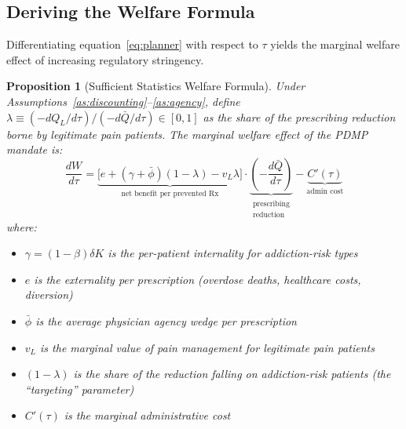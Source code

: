 \documentclass[12pt]{article}
\newtheorem{proposition}{Proposition}
\begin{document}
\subsection{Deriving the Welfare Formula}\label{sec:framework_derivation}

Differentiating equation~\eqref{eq:planner} with respect to $\tau$ yields the marginal welfare effect of increasing regulatory stringency.

\begin{proposition}[Sufficient Statistics Welfare Formula]\label{prop:welfare}
Under Assumptions~\ref{as:discounting}--\ref{as:agency}, define $\lambda \equiv (-dQ_L/d\tau)/(-d\bar{Q}/d\tau) \in [0,1]$ as the share of the prescribing reduction borne by legitimate pain patients. The marginal welfare effect of the PDMP mandate is:
\begin{equation}\label{eq:welfare}
\frac{dW}{d\tau} = \underbrace{\Big[e + (\gamma + \bar{\phi})(1-\lambda) - v_L \lambda\Big]}_{\text{net benefit per prevented Rx}} \cdot \underbrace{\left(-\frac{d\bar{Q}}{d\tau}\right)}_{\substack{\text{prescribing}\\\text{reduction}}} - \underbrace{C'(\tau)}_{\text{admin cost}}
\end{equation}
where:
\begin{itemize}
\item $\gamma = (1 - \beta)\delta K$ is the per-patient internality for addiction-risk types
\item $e$ is the externality per prescription (overdose deaths, healthcare costs, diversion)
\item $\bar{\phi}$ is the average physician agency wedge per prescription
\item $v_L$ is the marginal value of pain management for legitimate pain patients
\item $(1-\lambda)$ is the share of the reduction falling on addiction-risk patients (the ``targeting'' parameter)
\item $C'(\tau)$ is the marginal administrative cost
\end{itemize}
\end{proposition}
\end{document}
